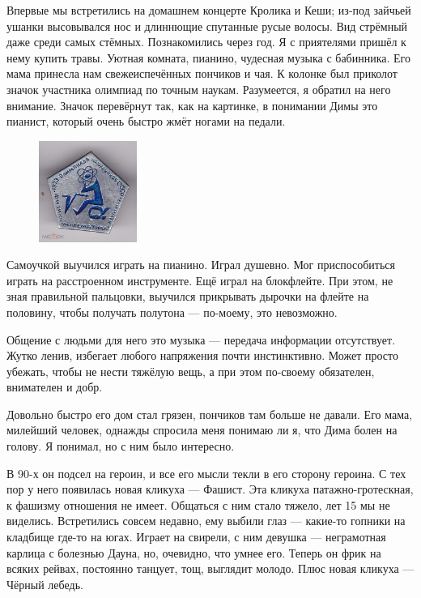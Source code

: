 \documentclass{book}
\begin{document}
Впервые мы встретились на домашнем концерте Кролика и Кеши;
из-под зайчьей ушанки высовывался нос и длиннющие спутанные русые волосы.
Вид стрёмный даже среди самых стёмных.
Познакомились через год.
Я с приятелями пришёл к нему купить травы.
Уютная комната, пианино, чудесная музыка с бабинника.
Его мама принесла нам свежеиспечённых пончиков и чая.
К колонке был приколот значок участника олимпиад по точным наукам.
Разумеется, я обратил на него внимание.
Значок перевёрнут так, как на картинке, в понимании Димы это пианист, который очень быстро жмёт ногами на педали.

\begin{figure}
\vskip-3mm
\centering
\includegraphics[width=32mm,angle=180,trim=4 7 4 7, clip]{pics/znachyok}
\end{figure}

Самоучкой выучился играть на пианино.
Играл душевно.
Мог приспособиться играть на расстроенном инструменте.
Ещё играл на блокфлейте.
При этом, не зная правильной пальцовки, выучился прикрывать дырочки на флейте на половину, чтобы получать полутона --- по-моему, это невозможно.

Общение с людьми для него это музыка --- передача информации отсутствует.
Жутко ленив, избегает любого напряжения почти инстинктивно.
Может просто убежать, чтобы не нести тяжёлую вещь, а при этом по-своему обязателен, внимателен и добр.

Довольно быстро его дом стал грязен, пончиков там больше не давали.
Его мама, милейший человек, однажды спросила меня понимаю ли я, что Дима болен на голову.
Я понимал, но с ним было интересно.

В 90-х он подсел на героин, и все его мысли текли в его сторону героина.
С тех пор у него появилась новая кликуха --- Фашист.
Эта кликуха патажно-гротескная, к фашизму отношения не имеет.
Общаться с ним стало тяжело, лет 15 мы не виделись.
Встретились совсем недавно, ему выбили глаз --- какие-то гопники на кладбище где-то на югах.
Играет на свирели, с ним девушка --- неграмотная карлица с болезнью Дауна, но, очевидно, что умнее его.
Теперь он фрик на всяких рейвах, постоянно танцует, тощ, выглядит молодо.
Плюс новая кликуха --- Чёрный лебедь.
\end{document}
